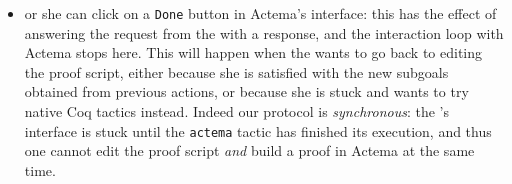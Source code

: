 \begin{itemize}
  \item or she can click on a \texttt{Done} button in Actema's interface: this
  has the effect of answering the  request from the
   with a  response, and the interaction loop with
  Actema stops here. This will happen when the  wants to go back
  to editing the proof script, either because she is satisfied with the new
  subgoals obtained from previous actions, or because she is stuck and wants to
  try native Coq tactics instead. Indeed our protocol is \emph{synchronous}: the
  's interface is stuck until the \texttt{actema} tactic has
  finished its execution, and thus one cannot edit the proof script \emph{and}
  build a proof in Actema at the same time.
\end{itemize}

